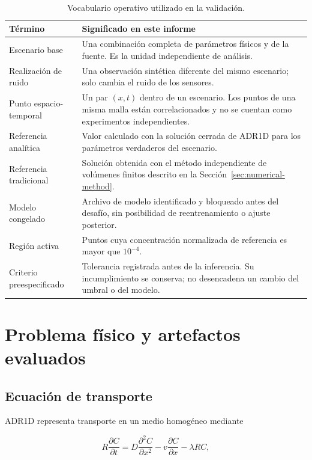 \documentclass[11pt,a4paper]{article}
\begin{document}
\begin{table}[htbp]
\centering
\caption{Vocabulario operativo utilizado en la validación.}
\label{tab:vocabulary}
\small
\begin{tabularx}{\textwidth}{@{}>{\raggedright\arraybackslash}p{3.6cm}Y@{}}
\toprule
Término & Significado en este informe \\
\midrule
Escenario base & Una combinación completa de parámetros físicos y de la
fuente. Es la unidad independiente de análisis. \\
Realización de ruido & Una observación sintética diferente del mismo escenario;
solo cambia el ruido de los sensores. \\
Punto espacio-temporal & Un par $(x,t)$ dentro de un escenario. Los puntos de
una misma malla están correlacionados y no se cuentan como experimentos
independientes. \\
Referencia analítica & Valor calculado con la solución cerrada de ADR1D para
los parámetros verdaderos del escenario. \\
Referencia tradicional & Solución obtenida con el método independiente de
volúmenes finitos descrito en la Sección~\ref{sec:numerical-method}. \\
Modelo congelado & Archivo de modelo identificado y bloqueado antes del desafío,
sin posibilidad de reentrenamiento o ajuste posterior. \\
Región activa & Puntos cuya concentración normalizada de referencia es mayor
que $10^{-4}$. \\
Criterio preespecificado & Tolerancia registrada antes de la inferencia. Su
incumplimiento se conserva; no desencadena un cambio del umbral o del modelo. \\
\bottomrule
\end{tabularx}
\end{table}

\section{Problema físico y artefactos evaluados}

\subsection{Ecuación de transporte}

ADR1D representa transporte en un medio homogéneo mediante

\begin{equation}
R\frac{\partial C}{\partial t}
=D\frac{\partial^2 C}{\partial x^2}
-v\frac{\partial C}{\partial x}
-\lambda R C,
\label{eq:adr}
\end{equation}
\end{document}
